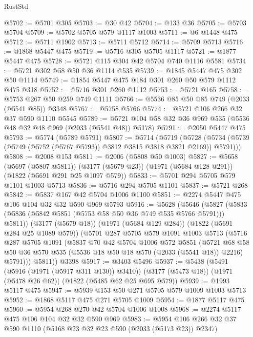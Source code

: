 \begin{lexlean}{RustStd}
\begin{coremodule}
@5702 := @5701 @305
@5703 := @30 @42
@5704 := @133 @36
@5705 := @5703 @5704
@5709 := @5702 @5705 @579 @1117 @1003
@5711 := @6 @1448 @475
@5712 := @5711 @1902
@5713 := @5711 @5712
@5714 := @5709 @5713
@5716 := @1868 @5447 @475
@5719 := @5716 @305 @5705 @1117
@5721 := @1877 @5447 @475
@5728 := @5721 @115 @304 @42 @5704 @740 @1116 @5581
@5734 := @5721 @302 @58 @50 @36 @1114 @535
@5739 := @1845 @5447 @475 @302 @50 @1114
@5749 := @1854 @5447 @475 @184 @301 @260 @50 @579 @1112 @475 @318
@5752 := @5716 @301 @260 @1112
@5753 := @5721 @165
@5758 := @5753 @267 @50 @259 @749 @1111
@5766 := @5536 @85 @50 @85 @749 (@2033 (@5541 @85)) @3348
@5767 := @5758 @5766
@5774 := @5721 @106 @266 @32 @37 @590 @1110 @5545
@5789 := @5721 @104 @58 @32 @36 @969 @535 (@5536 @48 @32 @48 @969 (@2033 (@5541 @48)) @5178)
@5791 := @2050 @5447 @475
@5793 := @5774 (@5789 @5791)
@5807 := @5714
    (@5719
      (@5728 (@5734 (@5739 (@5749 (@5752 (@5767 @5793)) @3812 @3815 @3818 @3821 @2169)) @5791)))
@5808 := @2008 @153
@5811 := @2006 (@5808 @50 @1003)
@5827 := @5658
    (@5697 (@5807 @5811))
    (@3177 (@5679 @23))
    (@1971 (@5684 @128 @291))
    (@1822 (@5691 @291 @25 @1097 @579))
@5833 := @5701 @294 @5705 @579 @1101 @1003 @5713
@5836 := @5716 @294 @5705 @1101
@5837 := @5721 @268
@5842 := @5837 @167 @42 @5704 @1006 @1100
@5851 := @2274 @5447 @475 @106 @104 @32 @32 @590 @969 @5793
@5916 := @5628
    (@5646
      (@5827 (@5833 (@5836 (@5842 @5851 (@5753 @58 @50 @36 @749 @535 @5766 @5791))) @5811))
      (@3177 (@5679 @18))
      (@1971 (@5684 @129 @284))
      (@1822 (@5691 @284 @25 @1089 @579))
      (@5701
        @287
        @5705
        @579
        @1091
        @1003
        @5713
        (@5716
          @287
          @5705
          @1091
          (@5837
            @70
            @42
            @5704
            @1006
            @572
            @5851
            (@5721
              @68
              @58
              @50
              @36
              @570
              @535
              (@5536 @18 @50 @18 @570 (@2033 (@5541 @18)) @2216)
              @5791)))
        @5811))
    @3398
@5917 := @3403 @5496
@5937 := @5438
    (@5491 (@5916 (@1971 (@5917 @311 @130)) @3410))
    (@3177 (@5473 @18))
    (@1971 (@5478 @26 @62))
    (@1822 (@5485 @62 @25 @695 @579))
@5939 := @1993 @5117 @475
@5947 := @5939 @153 @50 @271 @5705 @579 @1009 @1003 @5713
@5952 := @1868 @5117 @475 @271 @5705 @1009
@5954 := @1877 @5117 @475
@5960 := @5954 @268 @270 @42 @5704 @1006 @1008
@5968 := @2274 @5117 @475 @106 @104 @32 @32 @590 @969
@5983 := @5954 @106 @266 @32 @37 @590 @1110 (@5168 @23 @32 @23 @590 (@2033 (@5173 @23)) @2347)

\end{coremodule}
\end{lexlean}
